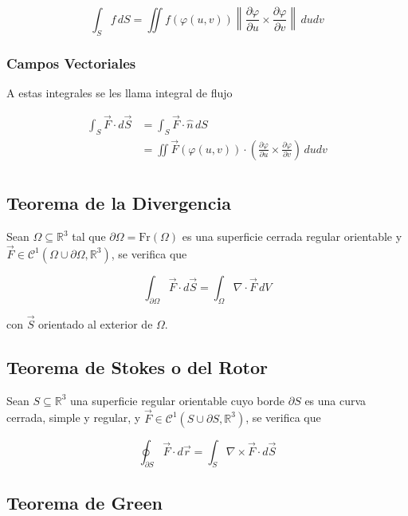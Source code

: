 \[\int_S f\,dS = \iint f(\varphi(u, v))\left\|
\frac{\partial\varphi}{\partial u}\times
\frac{\partial\varphi}{\partial v}\right\|\,dudv\]

\subsubsection{Campos Vectoriales}

A estas integrales se les llama integral de flujo

\begin{equation}
\begin{split}
\int_S \Vec{F}\cdot d\Vec{S} & = \int_S \Vec{F}\cdot\hat{n} \,dS\\
& =\iint \Vec{F}(\varphi(u, v))\cdot\left(
\frac{\partial\varphi}{\partial u}\times
\frac{\partial\varphi}{\partial v}\right)\,dudv\\
\end{split}
\nonumber
\end{equation}

\subsection{Teorema de la Divergencia}

Sean $\Omega\subseteq\mathbb{R}^3$ tal que $\partial\Omega=\mathrm{Fr}(\Omega)$ es una superficie cerrada regular orientable y $\Vec{F}\in\mathcal{C}^1(\Omega\cup\partial\Omega,\mathbb{R}^3)$, se verifica que

\[\int_{\partial \Omega}\Vec{F}\cdot d\Vec{S}=
\int_\Omega\nabla\cdot\Vec{F}\,dV\]

con $\Vec{S}$ orientado al exterior de $\Omega$.

\subsection{Teorema de Stokes o del Rotor}

Sean $S\subseteq\mathbb{R}^3$ una superficie regular orientable cuyo borde $\partial S$ es una curva cerrada, simple y regular, y $\Vec{F}\in\mathcal{C}^1(S\cup\partial S,\mathbb{R}^3)$, se verifica que

\[\oint_{\partial S}\Vec{F}\cdot d\Vec{r}=
\int_S\nabla\times\Vec{F}\cdot d\Vec{S}\]

\subsection{Teorema de Green}

